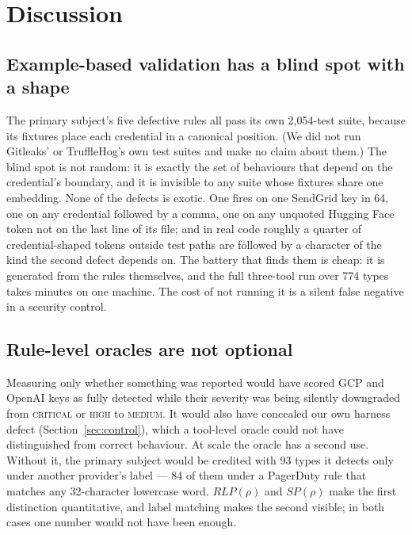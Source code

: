 \documentclass[pdflatex,sn-basic]{sn-jnl}
\begin{document}
\section{Discussion}

\subsection{Example-based validation has a blind spot with a shape}
\label{sec:discussion-cost}

The primary subject's five defective rules all pass its own 2{,}054-test suite, because its fixtures place each credential in a canonical position. (We did not run Gitleaks' or TruffleHog's own test suites and make no claim about them.) The blind spot is not random: it is exactly the set of behaviours that depend on the credential's boundary, and it is invisible to any suite whose fixtures share one embedding. None of the defects is exotic. One fires on one SendGrid key in 64, one on any credential followed by a comma, one on any unquoted Hugging Face token not on the last line of its file; and in real code roughly a quarter of credential-shaped tokens outside test paths are followed by a character of the kind the second defect depends on. The battery that finds them is cheap: it is generated from the rules themselves, and the full three-tool run over 774 types takes minutes on one machine. The cost of not running it is a silent false negative in a security control.

\subsection{Rule-level oracles are not optional}

Measuring only whether something was reported would have scored GCP and OpenAI keys as fully detected while their severity was being silently downgraded from \textsc{critical} or \textsc{high} to \textsc{medium}. It would also have concealed our own harness defect (Section~\ref{sec:control}), which a tool-level oracle could not have distinguished from correct behaviour. At scale the oracle has a second use. Without it, the primary subject would be credited with 93 types it detects only under another provider's label --- 84 of them under a PagerDuty rule that matches any 32-character lowercase word. $RLP(\rho)$ and $SP(\rho)$ make the first distinction quantitative, and label matching makes the second visible; in both cases one number would not have been enough.
\end{document}
